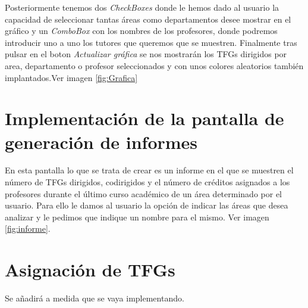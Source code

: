 Posteriormente tenemos dos \emph{CheckBoxes} donde le hemos dado al usuario la capacidad de seleccionar tantas áreas como departamentos desee mostrar en el gráfico y un \emph{ComboBox} con los nombres de los profesores, donde podremos introducir uno a uno los tutores que queremos que se muestren. Finalmente tras pulsar en el boton \emph{Actualizar gráfica} se nos mostrarán los TFGs dirigidos por area, departamento o profesor seleccionados y con unos colores aleatorios también implantados.Ver imagen \ref{fig:Grafica}


\section{Implementación de la pantalla de generación de informes}

En esta pantalla lo que se trata de crear es un informe en el que se muestren el número de TFGs dirigidos, codirigidos y el número de créditos asignados a los profesores durante el último curso académico de un área determinado por el usuario.
Para ello le damos al usuario la opción de indicar las áreas que desea analizar y le pedimos que indique un nombre para el mismo. Ver imagen \ref{fig:informe}.


\section{Asignación de TFGs}

Se añadirá a medida que se vaya implementando.